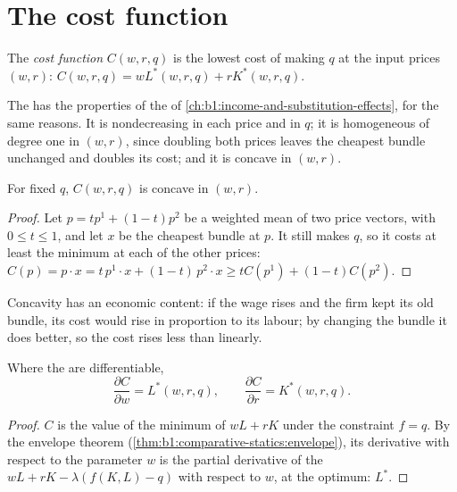 \section{The cost function}\label{sec:b1:cost-minimisation:cost-function}

\begin{definition}\label{def:b1:cost-minimisation:cost-function}
The \emph{cost function} $C(w, r, q)$ is the lowest cost of making $q$ at the
input prices $(w, r)$:
$C(w, r, q) = wL^*(w, r, q) + rK^*(w, r, q)$.
\end{definition}

The  has the properties of the  of
\cref{ch:b1:income-and-substitution-effects}, for the same reasons. It is
nondecreasing in each price and in $q$; it is homogeneous of degree one in
$(w, r)$, since doubling both prices leaves the cheapest bundle unchanged
and doubles its cost; and it is concave in $(w, r)$.

\begin{proposition}[Concavity]\label{prop:b1:cost-minimisation:concave}
For fixed $q$, $C(w, r, q)$ is concave in $(w, r)$.
\end{proposition}

\begin{proof}
Let $p = tp^1 + (1 - t)p^2$ be a weighted mean of two price vectors, with
$0 \le t \le 1$, and let $x$ be the cheapest bundle at $p$. It still makes $q$,
so it costs at least the minimum at each of the other prices:
$C(p) = p\cdot x = t\,p^1\cdot x + (1 - t)\,p^2\cdot x \ge tC(p^1) + (1 - t)C(p^2)$.
\end{proof}

Concavity has an economic content: if the wage rises and the firm kept its
old bundle, its cost would rise in proportion to its labour; by changing
the bundle it does better, so the cost rises less than linearly.

\begin{theorem}\label{thm:b1:cost-minimisation:shephard}
Where the  are differentiable,
\[
\frac{\partial C}{\partial w} = L^*(w, r, q),\qquad \frac{\partial C}{\partial r} = K^*(w, r, q).
\]
\end{theorem}

\begin{proof}
$C$ is the value of the minimum of $wL + rK$ under the constraint $f = q$. By
the envelope theorem (\cref{thm:b1:comparative-statics:envelope}), its
derivative with respect to the parameter $w$ is the partial derivative of
the  $wL + rK - \lambda(f(K, L) - q)$ with respect to $w$, at the
optimum: $L^*$.
\end{proof}

